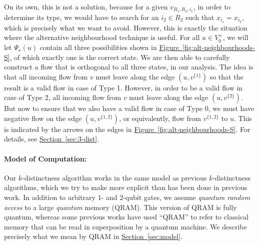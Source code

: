 \documentclass{article}
\renewcommand{\sec}[1]{\hyperref[sec:#1]{Section~\ref*{sec:#1}}}
\newcommand{\fig}[1]{\hyperref[fig:#1]{Figure~\ref*{fig:#1}}}
\renewcommand{\>}{\rangle}
\newcommand{\<}{\langle}
\renewcommand{\(}{\left(}
\renewcommand{\)}{\right)}
\begin{document}

On its own, this is not a solution, because for a given $v_{R_1,R_2,i_1}$, in order to determine its type, we would have to search for an $i_2\in R_2$ such that $x_{i_1}=x_{i_2}$, which is precisely what we want to avoid. However, this is exactly the situation where the alternative neighbourhood technique is useful. For all $u\in V_0^+$, we will let $\Psi_\star(u)$ contain all three possibilities shown in \fig{alt-neighbourhoods-S}, of which exactly one is the correct state. We are then able to carefully construct a flow that is orthogonal to all three states, in our analysis. The idea is that all incoming flow from $v$ must leave along the edge $(u,v^{\{1\}})$ so that the result is a valid flow in case of Type 1. However, in order to be a valid flow in case of Type 2, all incoming flow from $v$ must leave along the edge $(u,v^{\{2\}})$. But now to ensure that we also have a valid flow in case of Type 0, we must have negative flow on the edge $(u,v^{\{1,2\}})$, or equivalently, flow from $v^{\{1,2\}}$ to $u$. This is indicated by the arrows on the edges in \fig{alt-neighbourhoods-S}. For details, see \sec{3-dist}. 

\paragraph{Model of Computation:} Our $k$-distinctness algorithm works in the same model as previous $k$-distinctness algorithms, which we try to make more explicit than has been done in previous work. In addition to arbitrary 1- and 2-qubit gates, we assume \emph{quantum random access} to a large \emph{quantum} memory (QRAM). This version of QRAM is fully quantum, whereas some previous works have used ``QRAM'' to refer to classical memory that can be read in superposition by a quantum machine.  We describe precisely what we mean by QRAM in \sec{model}.
\end{document}
